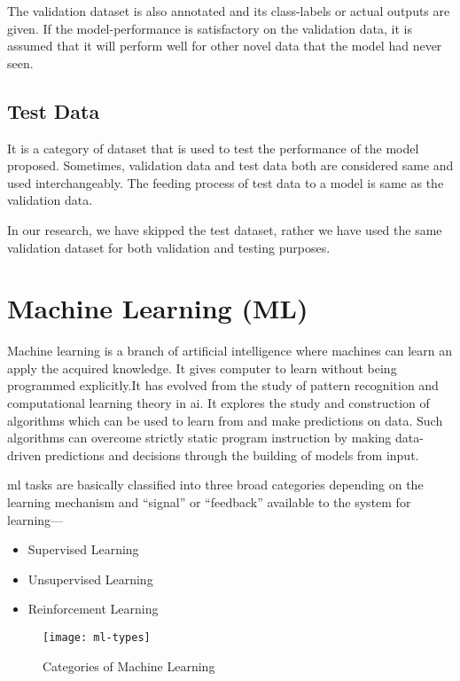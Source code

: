             The validation dataset is also annotated and its class-labels or actual outputs are given. If the model-performance is satisfactory on the validation data, it is assumed that it will perform well for other novel data that the model had never seen.
            
        \subsection{Test Data}
            It is a category of dataset that is used to test the performance of the model proposed. Sometimes, validation data and test data both are considered same and used interchangeably. The feeding process of test data to a model is same as the validation data.
            
            In our research, we have skipped the test dataset, rather we have used the same validation dataset for both validation and testing purposes.
            
    \section{Machine Learning (ML)}
        Machine learning is a branch of artificial intelligence where machines can learn an apply the acquired knowledge. It gives computer to learn without being programmed explicitly.It has evolved from the study of pattern recognition and computational learning theory in \acrfull{ai}. It explores the study and construction of algorithms which can be used to learn from and make predictions on data. Such algorithms can overcome strictly static program instruction by making data-driven predictions and decisions through the building of models from input.
        
        \acrshort{ml} tasks are basically classified into three broad categories depending on the learning mechanism and ``signal'' or ``feedback'' available to the system for learning---
        \begin{itemize}
         \item Supervised Learning
         \item Unsupervised Learning
         \item Reinforcement Learning
        \end{itemize}
        
        \begin{figure}[h]
            \centering
            \texttt{[image: ml-types]}
            \caption{Categories of Machine Learning}
            \label{fig:ml_types}
        \end{figure} 
        
